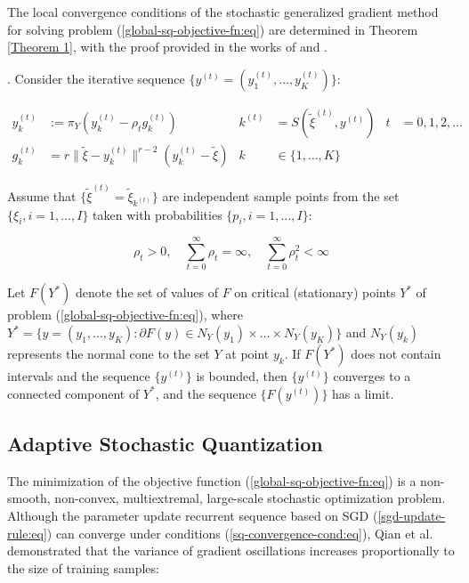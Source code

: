 The local convergence conditions of the stochastic generalized gradient method for solving problem (\ref{global-sq-objective-fn:eq}) are determined in Theorem \ref{Theorem 1}, with the proof provided in the works of \cite{Ermoliev_Norkin_2003} and \cite{Ermolev_Norkin_1998}.

\begin{theorem}
    \label{Theorem 1} \cite{Ermoliev_Norkin_2003,Ermolev_Norkin_1998}. Consider the iterative sequence $ \{ y^{(t)} = (y_1^{(t)}, \ldots, y_K^{(t)}) \} $:

    \begin{align}
        \label{sq-iter:eq}
            y_k^{(t)} &:= \pi_Y (y_k^{(t)} - \rho_t g_k^{(t)}) & k^{(t)} &= S(\tilde{\xi}^{(t)}, y^{(t)}) & t &= 0, 1, 2, \ldots \nonumber \\
            g_k^{(t)} &= r \| \tilde{\xi} - y_k^{(t)} \|^{r - 2} (y_k^{(t)} - \tilde{\xi}) & k &\in \{ 1, \ldots, K \}
    \end{align}

    Assume that $ \{ \tilde{\xi}^{(t)} = \tilde{\xi}_{k^{(t)}} \} $ are independent sample points from the set $ \{ \xi_i, i = 1, \ldots, I \} $ taken with probabilities $ \{ p_i, i = 1, \ldots, I \} $:

    \begin{equation}
        \label{sq-convergence-cond:eq}
            \rho_t > 0, \quad \sum_{t=0}^{\infty} \rho_t = \infty, \quad \sum_{t=0}^{\infty} \rho_t^2 < \infty
    \end{equation}

    Let $ F(Y^*) $ denote the set of values of $ F $ on critical (stationary) points $ Y^* $ of problem (\ref{global-sq-objective-fn:eq}), where $ Y^* = \{ y = (y_1, \ldots, y_K): \partial F(y) \in N_Y (y_1) \times \ldots \times N_Y (y_K) \} $ and $ N_Y (y_k) $ represents the normal cone to the set $ Y $ at point $ y_k $. If $ F(Y^*) $ does not contain intervals and the sequence $ \{ y^{(t)} \} $ is bounded, then $ \{ y^{(t)} \} $ converges to a connected component of $ Y^* $, and the sequence $ \{ F(y^{(t)}) \} $ has a limit.
\end{theorem}

\subsection{Adaptive Stochastic Quantization}

The minimization of the objective function (\ref{global-sq-objective-fn:eq}) is a non-smooth, non-convex, multiextremal, large-scale stochastic optimization problem. Although the parameter update recurrent sequence based on SGD (\ref{sgd-update-rule:eq}) can converge under conditions (\ref{sq-convergence-cond:eq}), Qian et al. \cite{qian2020} demonstrated that the variance of gradient oscillations increases proportionally to the size of training samples:

